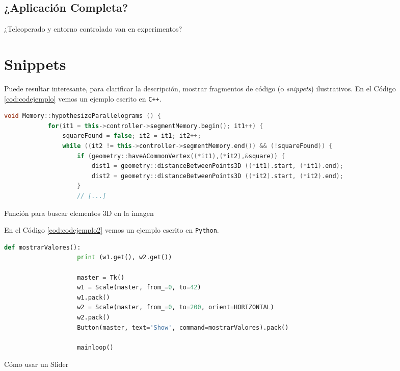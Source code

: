 \subsection{¿Aplicación Completa?}


¿Teleoperado y entorno controlado van en experimentos?



\section{Snippets}

Puede resultar interesante, para clarificar la descripción, mostrar fragmentos de código (o \textit{snippets}) ilustrativos. En el Código \ref{cod:codejemplo} vemos un ejemplo escrito en \texttt{C++}.

\begin{code}[h]
	\begin{lstlisting}[language=C++]
		void Memory::hypothesizeParallelograms () {
			for(it1 = this->controller->segmentMemory.begin(); it1++) {
				squareFound = false; it2 = it1; it2++;
				while ((it2 != this->controller->segmentMemory.end()) && (!squareFound)) {
					if (geometry::haveACommonVertex((*it1),(*it2),&square)) {
						dist1 = geometry::distanceBetweenPoints3D ((*it1).start, (*it1).end);
						dist2 = geometry::distanceBetweenPoints3D ((*it2).start, (*it2).end);
					}
					// [...]
				\end{lstlisting}
				\caption[Función para buscar elementos 3D en la imagen]{Función para buscar elementos 3D en la imagen}
				\label{cod:codejemplo}
			\end{code}
			
			En el Código \ref{cod:codejemplo2} vemos un ejemplo escrito en \texttt{Python}.
			
			\begin{code}[h]
				\begin{lstlisting}[language=Python]
					def mostrarValores():
					print (w1.get(), w2.get())
					
					master = Tk()
					w1 = Scale(master, from_=0, to=42)
					w1.pack()
					w2 = Scale(master, from_=0, to=200, orient=HORIZONTAL)
					w2.pack()
					Button(master, text='Show', command=mostrarValores).pack()
					
					mainloop()
				\end{lstlisting}
				\caption[Cómo usar un Slider]{Cómo usar un Slider}
				\label{cod:codejemplo2}
			\end{code}
			
